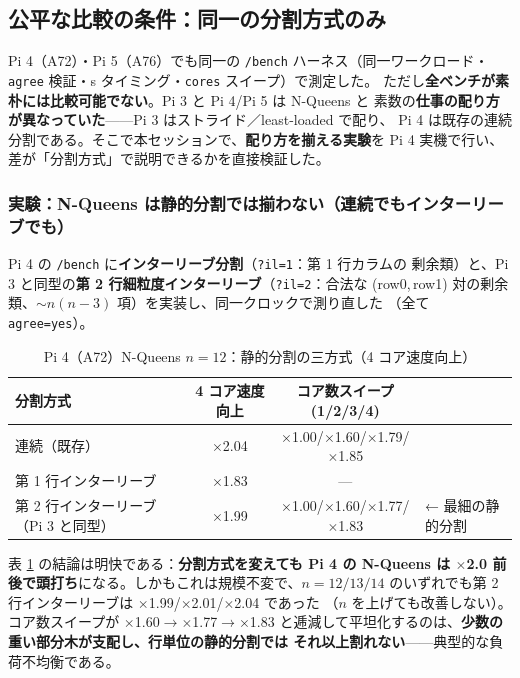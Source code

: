 \documentclass[11pt,a4paper]{article}
\newcommand{\route}[1]{\texttt{#1}}
\newcommand{\spd}[1]{$\times$#1}
\begin{document}
\subsection{公平な比較の条件：同一の分割方式のみ}
\label{sec:cross-fair}

Pi 4（A72）・Pi 5（A76）でも同一の \route{/bench} ハーネス（同一ワークロード・
\texttt{agree} 検証・\textmu s タイミング・\texttt{cores} スイープ）で測定した。
ただし\textbf{全ベンチが素朴には比較可能でない}。Pi 3 と Pi 4/Pi 5 は N-Queens と
素数の\textbf{仕事の配り方が異なっていた}——Pi 3 はストライド／least-loaded で配り、
Pi 4 は既存の連続分割である。そこで本セッションで、\textbf{配り方を揃える実験}を
Pi 4 実機で行い、差が「分割方式」で説明できるかを直接検証した。

\subsubsection*{実験：N-Queens は静的分割では揃わない（連続でもインターリーブでも）}

Pi 4 の \route{/bench} に\textbf{インターリーブ分割}（\texttt{?il=1}：第 1 行カラムの
剰余類）と、Pi 3 と同型の\textbf{第 2 行細粒度インターリーブ}（\texttt{?il=2}：合法な
(row0,\,row1) 対の剰余類、$\sim n(n{-}3)$ 項）を実装し、同一クロックで測り直した
（全て \texttt{agree=yes}）。

\begin{table}[htbp]
\centering
\caption{Pi 4（A72）N-Queens $n{=}12$：静的分割の三方式（4 コア速度向上）}
\label{tab:pi4-nq-split}
\small
\begin{tabular}{@{}lccl@{}}
\toprule
分割方式 & 4 コア速度向上 & コア数スイープ(1/2/3/4) & \\
\midrule
連続（既存）                 & \spd{2.04} & \spd{1.00}/\spd{1.60}/\spd{1.79}/\spd{1.85} & \\
第 1 行インターリーブ        & \spd{1.83} & --- & \\
第 2 行インターリーブ（Pi 3 と同型） & \spd{1.99} & \spd{1.00}/\spd{1.60}/\spd{1.77}/\spd{1.83} & ← 最細の静的分割 \\
\bottomrule
\end{tabular}
\end{table}

\noindent
表 \ref{tab:pi4-nq-split} の結論は明快である：\textbf{分割方式を変えても Pi 4 の
N-Queens は \spd{2.0} 前後で頭打ち}になる。しかもこれは規模不変で、$n{=}12/13/14$
のいずれでも第 2 行インターリーブは \spd{1.99}/\spd{2.01}/\spd{2.04} であった
（$n$ を上げても改善しない）。コア数スイープが \spd{1.60}$\to$\spd{1.77}$\to$\spd{1.83}
と逓減して平坦化するのは、\textbf{少数の重い部分木が支配し、行単位の静的分割では
それ以上割れない}——典型的な負荷不均衡である。
\end{document}
